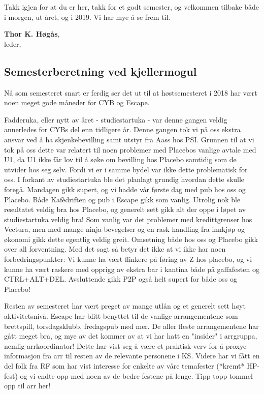 \documentclass[10pt,norsk,a4paper]{article}
\begin{document}
Takk igjen for at du er her, takk for et godt semester, og velkommen tilbake både i morgen, ut året, og i 2019. Vi har mye å se frem til.

\textbf{Thor K. Høgås}, \\
leder, \date{14.\ november 2018}

\subsection{Semesterberetning ved kjellermogul}
\begin{multicols}{2}
Nå som semesteret snart er ferdig ser det ut til at høstsemesteret i 2018 har vært noen meget gode måneder for CYB og Escape.

Fadderuka, eller nytt av året - studiestartuka - var denne gangen veldig annerledes for CYBs del enn tidligere år.
Denne gangen tok vi på oss ekstra ansvar ved å ha skjenkebevilling samt utstyr fra Aass hos PSI.
Grunnen til at vi tok på oss dette var relatert til noen problemer med Placebos vanlige avtale med U1,
da U1 ikke får lov til å søke om bevilling hos Placebo samtidig som de utvider hos seg selv.
Fordi vi er i samme bydel var ikke dette problematisk for oss.
I forkant av studiestartuka ble det planlagt grundig hvordan dette skulle foregå.
Mandagen gikk supert, og vi hadde vår første dag med pub hos oss og Placebo.
Både Kafèdriften og pub i Escape gikk som vanlig.
Utrolig nok ble resultatet veldig bra hos Placebo, og generelt sett gikk alt der oppe i løpet av studiestartuka veldig bra!
Som vanlig var det problemer med kredittgrenser hos Vectura, men med mange ninja-bevegelser og en rask handling fra innkjøp og økonomi gikk dette egentlig veldig greit.
Omsetning både hos oss og Placebo gikk over all forventning.
Med det sagt så betyr det ikke at vi ikke har noen forbedringspunkter:
Vi kunne ha vært flinkere på føring av Z hos placebo, og vi kunne ha vært raskere med opprigg av ekstra bar i kantina både på gaffafesten og CTRL+ALT+DEL.
Avsluttende gikk P2P også helt supert for både oss og Placebo!

Resten av semesteret har vært preget av mange utlån og et generelt sett høyt aktivitetsnivå.
Escape har blitt benyttet til de vanlige arrangementene som brettspill, torsdagsklubb, fredagspub med mer.
De aller fleste arrangementene har gått meget bra, og mye av det kommer av at vi har hatt en "insider" i arrgruppa, nemlig arrkoordinator!
Dette har vist seg å være et praktisk verv for å proxye informasjon fra arr til resten av de relevante personene i KS.
Videre har vi fått en del folk fra RF som har vist interesse for enkelte av våre temafester (*kremt* HP-fest) og vi endte opp med noen av de bedre festene på lenge.
Tipp topp tommel opp til arr her!


\end{multicols}
\end{document}
